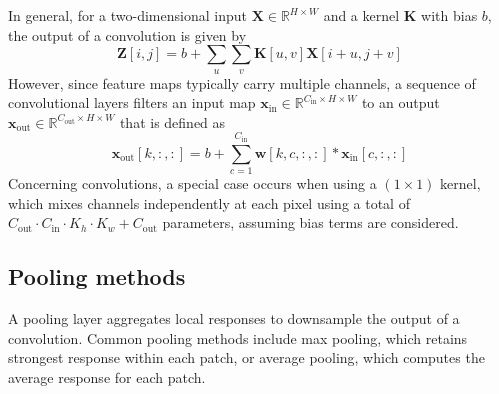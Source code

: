 \documentclass{report}
\begin{document}
\noindent In general, for a two-dimensional input $\displaystyle \mathbf{X} \in \mathbb{R}^{H \times W}$ and a kernel $\displaystyle \mathbf{K}$ with bias $\displaystyle b$, the output of a convolution is given by
\[\mathbf{Z}[i, j] = b + \sum_u\sum_v \mathbf{K}[u, v]\mathbf{X}[i + u, j + v]\]
However, since feature maps typically carry multiple channels, a sequence of convolutional layers filters an input map $\displaystyle \mathbf{x}_{\text{in}} \in \mathbb{R}^{C_{\text{in}} \times H \times W}$ to an output $\displaystyle \mathbf{x}_{\text{out}} \in \mathbb{R}^{C_{\text{out}} \times H \times W}$ that is defined as
\[\mathbf{x}_{\text{out}}[k, :, :] = b + \sum_{c = 1}^{C_{\text{in}}} \mathbf{w}[k, c, :, :] * \mathbf{x}_{\text{in}}[c, :, :]\]
Concerning convolutions, a special case occurs when using a $\displaystyle (1 \times 1)$ kernel, which mixes channels independently at each pixel using a total of $\displaystyle C_{\text{out}} \cdot C_{\text{in}} \cdot K_h \cdot K_w + C_{\text{out}}$ parameters, assuming bias terms are considered.
\subsection{Pooling methods}
A pooling layer aggregates local responses to downsample the output of a convolution. \newline
Common pooling methods include max pooling, which retains strongest response within each patch, or average pooling, which computes the average response for each patch.
\end{document}
